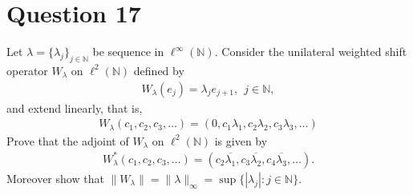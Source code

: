 \section{Question 17}
\horz

Let $\lambda = \{\lambda_j\}_{j\in \mathbb N}$ be sequence in $\ell^{\infty}(\mathbb N).$ Consider the unilateral weighted shift operator $W_{\lambda}$ on $\ell^2(\mathbb N)$ defined by 
\begin{align*}
W_{\lambda} (e_j)= \lambda_j e_{j+1},~~j\in \mathbb N,
\end{align*}
and extend linearly, that is, 
\begin{align*}
W_{\lambda} (c_1,c_2,c_3,\ldots)= (0,c_1\lambda_1,c_2\lambda_2,c_3\lambda_3,\ldots)
\end{align*}
Prove that the adjoint of $W_{\lambda}$ on $\ell^2(\mathbb N)$ is given by
\begin{align*}
W_{\lambda}^*(c_1,c_2,c_3,\ldots) = (c_2\overline{\lambda_1},c_3\overline{\lambda_2},c_4\overline{\lambda_3},\ldots).
\end{align*}
Moreover show that $\|W_{\lambda}\|= \|\lambda\|_{\infty} = \sup \{ |\lambda_j| : j\in \mathbb N\}.$

